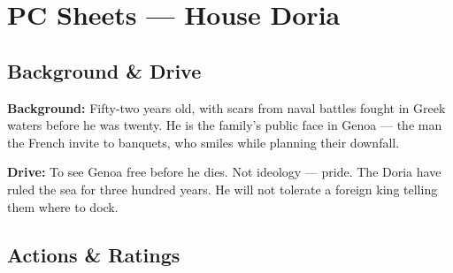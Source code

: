 %

\chapter{PC Sheets --- House Doria}



\section*{Background \& Drive}

\begin{rulebox}{}
  \textbf{Background:} Fifty-two years old, with scars from naval battles fought in
  Greek waters before he was twenty. He is the family's public face in Genoa ---
  the man the French invite to banquets, who smiles while planning their downfall.

  \medskip\noindent\textcolor{DoriaBlue}{\textbf{Drive:}} To see Genoa free before
  he dies. Not ideology --- pride. The Doria have ruled the sea for three hundred
  years. He will not tolerate a foreign king telling them where to dock.
\end{rulebox}

\section*{Actions \& Ratings}

